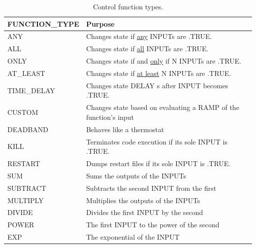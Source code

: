 \documentclass[11pt]{book}
\begin{document}
\begin{table}[h!]
\caption[Control function types]{Control function types.}
\label{tab:funcvalues}
\begin{center}
\begin{tabular}{|l||l|}
\hline
{\ct FUNCTION\_TYPE}              & Purpose   \\ \hline \hline
{\ct ANY}                         & Changes state if \underline{any} {\ct INPUT}s are {\ct .TRUE.}  \\ \hline
{\ct ALL}                         & Changes state if \underline{all} {\ct INPUT}s are {\ct .TRUE.}  \\ \hline
{\ct ONLY}                        & Changes state if and \underline{only} if {\ct N} {\ct INPUT}s are {\ct .TRUE.}  \\ \hline
{\ct AT\_LEAST}                   & Changes state if \underline{at least} {\ct N} {\ct INPUT}s are {\ct .TRUE.}  \\ \hline
{\ct TIME\_DELAY}                 & Changes state {\ct DELAY} s after {\ct INPUT} becomes {\ct .TRUE.} \\ \hline
{\ct CUSTOM}                      & Changes state based on evaluating a {\ct RAMP} of the function's input \\ \hline
{\ct DEADBAND}                    & Behaves like a thermostat  \\ \hline
{\ct KILL}                        & Terminates code execution if its sole {\ct INPUT} is {\ct .TRUE.}  \\ \hline
{\ct RESTART}                     & Dumps restart files if its sole {\ct INPUT} is {\ct .TRUE.} \\ \hline
{\ct SUM}                         & Sums the outputs of the {\ct INPUT}s \\ \hline
{\ct SUBTRACT}                    & Subtracts the second {\ct INPUT} from the first \\ \hline
{\ct MULTIPLY}                    & Multiplies the outputs of the {\ct INPUT}s \\ \hline
{\ct DIVIDE}                      & Divides the first {\ct INPUT} by the second \\ \hline
{\ct POWER}                       & The first {\ct INPUT} to the power of the second \\ \hline
{\ct EXP}                       & The exponential of the {\ct INPUT} \\ \hline

\end{tabular}
\end{center}
\end{table}
\end{document}

